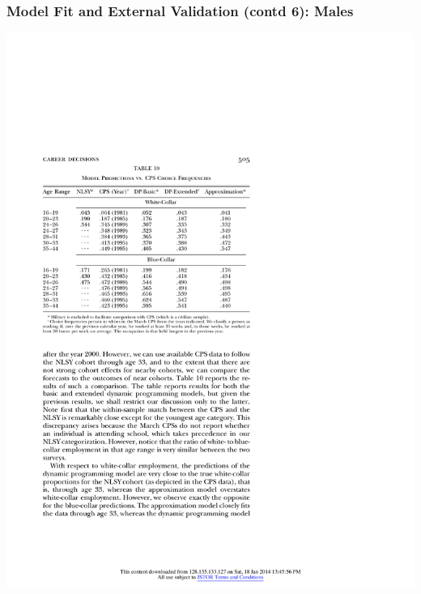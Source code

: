 \begin{frame}
	\frametitle{Model Fit and External Validation (contd 6): Males}
	\begin{center}
	\includegraphics[width=.9\textwidth]{tab-figs/table10_1997}
	\end{center}
\end{frame}

